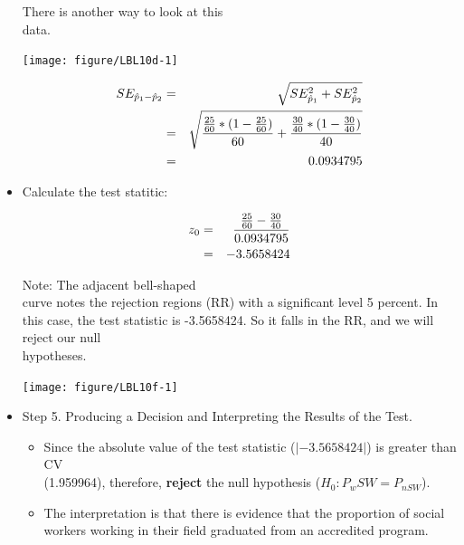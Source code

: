 \documentclass[11pt, chapterprefix=true]{scrbook}\usepackage[]{graphicx}\usepackage[]{color}
\begin{document}
\begin{itemize}
\begin{minipage}[h]{6cm}
\end{minipage} \hfill
\begin{minipage}[h]{6cm}

There is another way to look at this \\ data.



{\centering \texttt{[image: figure/LBL10d-1]} 

}




\end{minipage}

\begin{eqnarray*}
    SE_{\hat{p}_1-\hat{p}_2} &=& \sqrt{SE_{\hat{p}_1}^2 + SE_{\hat{p}_2}^2} \\
             &=& \sqrt{ \frac{\frac{25}{60} *(1 - \frac{25}{60})}{60} + \frac{\frac{30}{40} * (1 - \frac{30}{40})}{40} } \\ \vspace{3mm}
             &=& 0.0934795
  \end{eqnarray*}
    

  \item Calculate the test statitic:
  
    \begin{eqnarray*}
    z_0 &=& \frac{\frac{25}{60} - \frac{30}{40}}{0.0934795} \\ \vspace{3mm}
        &=& -3.5658424
    \end{eqnarray*}
    
\begin{minipage}[ht]{6cm}

Note: The adjacent bell-shaped \\ curve notes the rejection regions (RR) with a significant level 5 percent.  In this case, the test statistic is -3.5658424.  So it falls in the RR, and we will reject our null \\ hypotheses.

\end{minipage} \hfill
\begin{minipage}[ht]{6cm}
    


{\centering \texttt{[image: figure/LBL10f-1]} 

}




\end{minipage}


\item Step 5.  Producing a Decision and Interpreting the Results of the Test.
	\begin{itemize}
	\samepage
	\item Since the absolute value of the test statistic ($|-3.5658424|$) is greater than CV \\ (1.959964),  therefore, \textbf{reject} the null hypothesis ($H_0: P_wSW = P_{nSW}$).
	\samepage
	\item The interpretation is that there is evidence that the proportion of 
social workers working in their field graduated from an accredited program.
	\end{itemize}
	 

\end{itemize}
\end{document}
